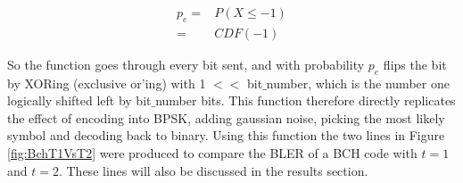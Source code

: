 \documentclass[12pt,onecolumn,letterpaper]{article}
\begin{document}
\begin{align}
   p_e =& P(X \leq -1) \nonumber\\
   =& CDF(-1)
   \label{eq:GaussianBitflip}
\end{align}

So the function goes through every bit sent, and with probability $p_e$ flips the bit by XORing (exclusive or'ing) with 1 $<<$ bit$\_$number, which is the number one logically shifted left by bit$\_$number bits. This function therefore directly replicates the effect of encoding into BPSK, adding gaussian noise, picking the most likely symbol and decoding back to binary. Using this function the two lines in Figure \ref{fig:BchT1VsT2} were produced to compare the BLER of a BCH code with $t=1$ and $t=2$. These lines will also be discussed in the results section.
\end{document}
